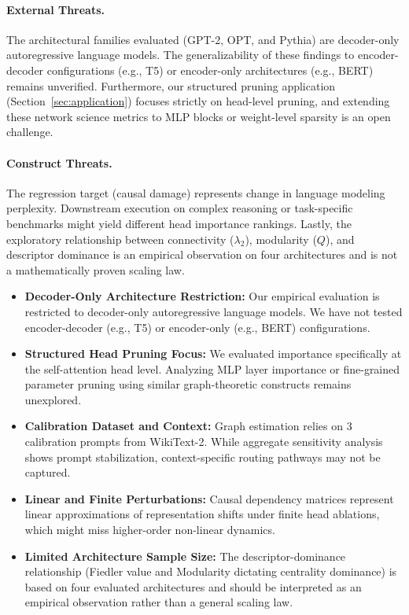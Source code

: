 \documentclass[11pt,a4paper]{article}
\theoremstyle{definition}
\theoremstyle{plain}
\begin{document}
\paragraph{External Threats.} The architectural families evaluated (GPT-2, OPT, and Pythia) are decoder-only autoregressive language models. The generalizability of these findings to encoder-decoder configurations (e.g., T5) or encoder-only architectures (e.g., BERT) remains unverified. Furthermore, our structured pruning application (Section~\ref{sec:application}) focuses strictly on head-level pruning, and extending these network science metrics to MLP blocks or weight-level sparsity is an open challenge.

\paragraph{Construct Threats.} The regression target (causal damage) represents change in language modeling perplexity. Downstream execution on complex reasoning or task-specific benchmarks might yield different head importance rankings. Lastly, the exploratory relationship between connectivity ($\lambda_2$), modularity ($Q$), and descriptor dominance is an empirical observation on four architectures and is not a mathematically proven scaling law.
\begin{itemize}
    \item \textbf{Decoder-Only Architecture Restriction:} Our empirical evaluation is restricted to decoder-only autoregressive language models. We have not tested encoder-decoder (e.g., T5) or encoder-only (e.g., BERT) configurations.
    \item \textbf{Structured Head Pruning Focus:} We evaluated importance specifically at the self-attention head level. Analyzing MLP layer importance or fine-grained parameter pruning using similar graph-theoretic constructs remains unexplored.
    \item \textbf{Calibration Dataset and Context:} Graph estimation relies on 3 calibration prompts from WikiText-2. While aggregate sensitivity analysis shows prompt stabilization, context-specific routing pathways may not be captured.
    \item \textbf{Linear and Finite Perturbations:} Causal dependency matrices represent linear approximations of representation shifts under finite head ablations, which might miss higher-order non-linear dynamics.
    \item \textbf{Limited Architecture Sample Size:} The descriptor-dominance relationship (Fiedler value and Modularity dictating centrality dominance) is based on four evaluated architectures and should be interpreted as an empirical observation rather than a general scaling law.
\end{itemize}
\end{document}
